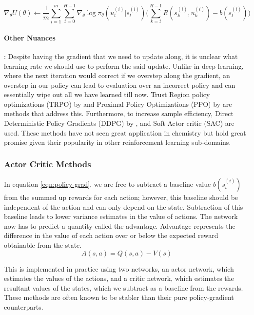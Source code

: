 \begin{equation}\label{eqn:policy-grad}
    \nabla_\theta U(\theta) \leftarrow \frac{1}{m} \sum_{i=1}^{m} \sum_{t=0}^{H-1} \nabla_\theta \log \pi_\theta (u_t^{(i)}|s_t^{(i)}) \Bigg(\sum_{k=t}^{H-1} R(s_k^{(i)}, u_k^{(i)}) - b(s_t^{(i)})\Bigg)
\end{equation}

\paragraph{Other Nuances}: Despite having the gradient that we need to update along, it is unclear what learning rate we should use to perform the said update. Unlike in deep learning, where the next iteration would correct if we overstep along the gradient, an overstep in our policy can lead to evaluation over an incorrect policy and can essentially wipe out all we have learned till now. Trust Region policy optimizations (TRPO) by \cite{trpo} and Proximal Policy Optimizations (PPO) by \cite{ppo} are methods that address this. Furthermore, to increase sample efficiency, Direct Deterministic Policy Gradients (DDPG) by \cite{ddpg}, and Soft Actor critic (SAC) \cite{sac} are used. These methods have not seen great application in chemistry but hold great promise given their popularity in other reinforcement learning sub-domains.

\subsubsection{Actor Critic Methods}

In equation \ref{eqn:policy-grad}, we are free to subtract a baseline value $b(s_t^{(i)})$ from the summed up rewards for each action; however, this baseline should be independent of the action and can only depend on the state. Subtraction of this baseline leads to lower variance estimates in the value of actions. The network now has to predict a quantity called the advantage. Advantage represents the difference in the value of each action over or below the expected reward obtainable from the state.
\begin{equation}\label{eqn:advantage}
    A(s, a) = Q(s, a) - V(s)
\end{equation}

This is implemented in practice using two networks, an actor network, which estimates the values of the actions, and a critic network, which estimates the resultant values of the states, which we subtract as a baseline from the rewards. These methods are often known to be stabler than their pure policy-gradient counterparts.

